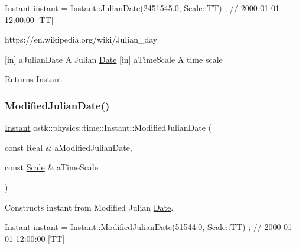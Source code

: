 \begin{DoxyCode}
\hyperlink{classostk_1_1physics_1_1time_1_1_instant_a132c1e4b2fe9a9a671109206e297bd5d}{Instant} instant = \hyperlink{classostk_1_1physics_1_1time_1_1_instant_a8826d68093086f8b203a5be940ef34fb}{Instant::JulianDate}(2451545.0, 
      \hyperlink{namespaceostk_1_1physics_1_1time_adf23d37bd8641fb76a0e98ab46a70df7adf1f3edb9115acb0a1e04209b7a9937b}{Scale::TT}) ; \textcolor{comment}{// 2000-01-01 12:00:00 [TT]}
\end{DoxyCode}


https\+://en.wikipedia.\+org/wiki/\+Julian\+\_\+day

\mbox{[}in\mbox{]} a\+Julian\+Date A Julian \hyperlink{classostk_1_1physics_1_1time_1_1_date}{Date}  \mbox{[}in\mbox{]} a\+Time\+Scale A time scale \begin{DoxyReturn}{Returns}
\hyperlink{classostk_1_1physics_1_1time_1_1_instant}{Instant} 
\end{DoxyReturn}
\mbox{\label{classostk_1_1physics_1_1time_1_1_instant_af515c6d0547e40a337efb865a71c2558}} 
\subsubsection{\texorpdfstring{Modified\+Julian\+Date()}{ModifiedJulianDate()}}
{\footnotesize\ttfamily \hyperlink{classostk_1_1physics_1_1time_1_1_instant}{Instant} ostk\+::physics\+::time\+::\+Instant\+::\+Modified\+Julian\+Date (\begin{DoxyParamCaption}\item[{const Real \&}]{a\+Modified\+Julian\+Date,  }\item[{const \hyperlink{namespaceostk_1_1physics_1_1time_adf23d37bd8641fb76a0e98ab46a70df7}{Scale} \&}]{a\+Time\+Scale }\end{DoxyParamCaption})\hspace{0.3cm}{\ttfamily [static]}}



Constructs instant from Modified Julian \hyperlink{classostk_1_1physics_1_1time_1_1_date}{Date}. 


\begin{DoxyCode}
\hyperlink{classostk_1_1physics_1_1time_1_1_instant_a132c1e4b2fe9a9a671109206e297bd5d}{Instant} instant = \hyperlink{classostk_1_1physics_1_1time_1_1_instant_af515c6d0547e40a337efb865a71c2558}{Instant::ModifiedJulianDate}(51544.0, 
      \hyperlink{namespaceostk_1_1physics_1_1time_adf23d37bd8641fb76a0e98ab46a70df7adf1f3edb9115acb0a1e04209b7a9937b}{Scale::TT}) ; \textcolor{comment}{// 2000-01-01 12:00:00 [TT]}
\end{DoxyCode}


